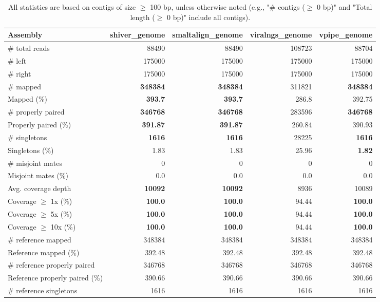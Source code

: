 \documentclass[12pt,a4paper]{article}
\begin{document}
\begin{table}[ht]
\begin{center}
\caption{All statistics are based on contigs of size $\geq$ 100 bp, unless otherwise noted (e.g., "\# contigs ($\geq$ 0 bp)" and "Total length ($\geq$ 0 bp)" include all contigs).}
\begin{tabular}{|l*{4}{|r}|}
\hline
Assembly & shiver\_genome & smaltalign\_genome & viralngs\_genome & vpipe\_genome \\ \hline
\# total reads & 88490 & 88490 & 108723 & 88704 \\ \hline
\# left & 175000 & 175000 & 175000 & 175000 \\ \hline
\# right & 175000 & 175000 & 175000 & 175000 \\ \hline
\# mapped & {\bf 348384} & {\bf 348384} & 311821 & {\bf 348384} \\ \hline
Mapped (\%) & {\bf 393.7} & {\bf 393.7} & 286.8 & 392.75 \\ \hline
\# properly paired & {\bf 346768} & {\bf 346768} & 283596 & {\bf 346768} \\ \hline
Properly paired (\%) & {\bf 391.87} & {\bf 391.87} & 260.84 & 390.93 \\ \hline
\# singletons & {\bf 1616} & {\bf 1616} & 28225 & {\bf 1616} \\ \hline
Singletons (\%) & 1.83 & 1.83 & 25.96 & {\bf 1.82} \\ \hline
\# misjoint mates & 0 & 0 & 0 & 0 \\ \hline
Misjoint mates (\%) & 0.0 & 0.0 & 0.0 & 0.0 \\ \hline
Avg. coverage depth & {\bf 10092} & {\bf 10092} & 8936 & 10089 \\ \hline
Coverage $\geq$ 1x (\%) & {\bf 100.0} & {\bf 100.0} & 94.44 & {\bf 100.0} \\ \hline
Coverage $\geq$ 5x (\%) & {\bf 100.0} & {\bf 100.0} & 94.44 & {\bf 100.0} \\ \hline
Coverage $\geq$ 10x (\%) & {\bf 100.0} & {\bf 100.0} & 94.44 & {\bf 100.0} \\ \hline
\# reference mapped & 348384 & 348384 & 348384 & 348384 \\ \hline
Reference mapped (\%) & 392.48 & 392.48 & 392.48 & 392.48 \\ \hline
\# reference properly paired & 346768 & 346768 & 346768 & 346768 \\ \hline
Reference properly paired (\%) & 390.66 & 390.66 & 390.66 & 390.66 \\ \hline
\# reference singletons & 1616 & 1616 & 1616 & 1616 \\ \hline

\end{tabular}
\end{center}
\end{table}
\end{document}
